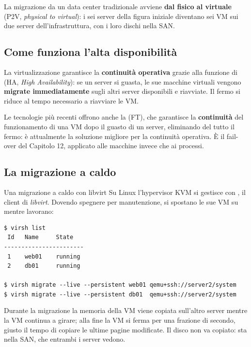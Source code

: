 La migrazione da un data center tradizionale avviene \textbf{dal fisico al virtuale} (P2V, \textit{physical to virtual}):
i sei server della figura iniziale diventano sei VM sui due server dell'infrastruttura, con i loro dischi nella SAN.

\subsection{Come funziona l'alta disponibilità}

La virtualizzazione garantisce la \textbf{continuità operativa} grazie alla funzione di  (HA,
\textit{High Availability}): se un server si guasta, le sue macchine virtuali vengono \textbf{migrate immediatamente} sugli
altri server disponibili e riavviate. Il fermo si riduce al tempo necessario a riavviare le VM.

Le tecnologie più recenti offrono anche la  (FT), che garantisce la \textbf{continuità} del
funzionamento di una VM dopo il guasto di un server, eliminando del tutto il fermo: è attualmente la soluzione migliore
per la continuità operativa. È il fail-over del Capitolo 12, applicato alle macchine invece che ai processi.

\subsection{La migrazione a caldo}


\begin{esempio}{Una migrazione a caldo con libvirt}
Su Linux l'hypervisor KVM si gestisce con , il client di \textit{libvirt}. Dovendo spegnere 
per manutenzione, si spostano le sue VM su  mentre lavorano:
\begin{lstlisting}[style=shell, name=Terminale]
$ virsh list
 Id   Name     State
-----------------------
 1    web01    running
 2    db01     running

$ virsh migrate --live --persistent web01 qemu+ssh://server2/system
$ virsh migrate --live --persistent db01  qemu+ssh://server2/system
\end{lstlisting}
Durante la migrazione la memoria della VM viene copiata sull'altro server mentre la VM continua a girare; alla fine la VM
si ferma per una frazione di secondo, giusto il tempo di copiare le ultime pagine modificate. Il disco non va copiato:
sta nella SAN, che entrambi i server vedono.
\end{esempio}

